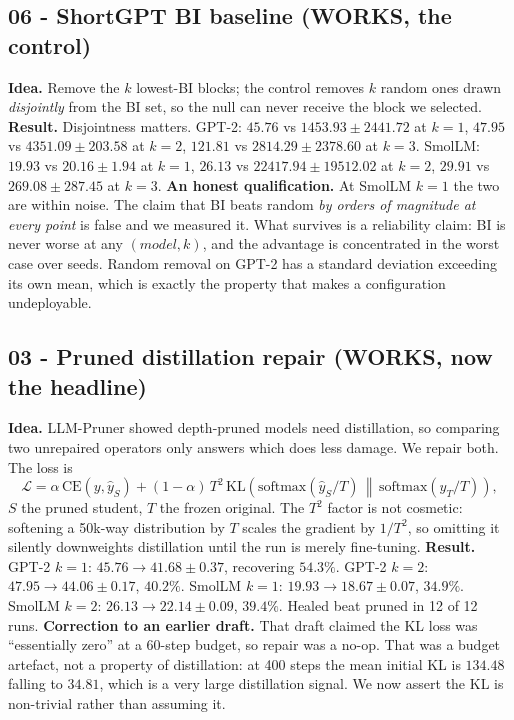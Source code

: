 \documentclass[11pt]{article}
\begin{document}
\subsection{06 - ShortGPT BI baseline (WORKS, the control)}
\textbf{Idea.} Remove the $k$ lowest-BI blocks; the control removes $k$
random ones drawn \emph{disjointly} from the BI set, so the null can never
receive the block we selected.
\textbf{Result.} Disjointness matters. GPT-2: $45.76$ vs $1453.93\pm2441.72$
at $k{=}1$, $47.95$ vs $4351.09\pm203.58$ at $k{=}2$, $121.81$ vs
$2814.29\pm2378.60$ at $k{=}3$. SmolLM: $19.93$ vs $20.16\pm1.94$ at
$k{=}1$, $26.13$ vs $22417.94\pm19512.02$ at $k{=}2$, $29.91$ vs
$269.08\pm287.45$ at $k{=}3$.
\textbf{An honest qualification.} At SmolLM $k{=}1$ the two are within noise.
The claim that BI beats random \emph{by orders of magnitude at every point} is
false and we measured it. What survives is a reliability claim: BI is never
worse at any $(model,k)$, and the advantage is concentrated in the worst case
over seeds. Random removal on GPT-2 has a standard deviation exceeding its own
mean, which is exactly the property that makes a configuration undeployable.

\subsection{03 - Pruned distillation repair (WORKS, now the headline)}
\textbf{Idea.} LLM-Pruner showed depth-pruned models need distillation, so
comparing two unrepaired operators only answers which does less damage. We
repair both. The loss is
\[
\mathcal{L} = \alpha\,\mathrm{CE}(y,\hat y_S) + (1-\alpha)\,T^2\,
\mathrm{KL}\!\left(\mathrm{softmax}(\hat y_S/T)\,\middle\|\,
\mathrm{softmax}(\hat y_T/T)\right),
\]
$S$ the pruned student, $T$ the frozen original. The $T^2$ factor is not
cosmetic: softening a 50k-way distribution by $T$ scales the gradient by
$1/T^2$, so omitting it silently downweights distillation until the run is
merely fine-tuning.
\textbf{Result.} GPT-2 $k{=}1$: $45.76\rightarrow41.68\pm0.37$, recovering
$54.3\%$. GPT-2 $k{=}2$: $47.95\rightarrow44.06\pm0.17$, $40.2\%$.
SmolLM $k{=}1$: $19.93\rightarrow18.67\pm0.07$, $34.9\%$. SmolLM $k{=}2$:
$26.13\rightarrow22.14\pm0.09$, $39.4\%$. Healed beat pruned in 12 of 12 runs.
\textbf{Correction to an earlier draft.} That draft claimed the KL loss was
``essentially zero'' at a 60-step budget, so repair was a no-op. That was a
budget artefact, not a property of distillation: at 400 steps the mean initial
KL is $134.48$ falling to $34.81$, which is a very large distillation signal.
We now assert the KL is non-trivial rather than assuming it.
\end{document}
